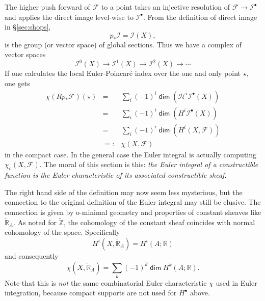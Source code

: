 \documentclass{psapm-l}
\theoremstyle{definition}
\theoremstyle{remark}
\numberwithin{equation}{section}
\begin{document}
The higher push forward of ${{\mathcal F}}$ to a point takes an injective resolution of ${{\mathcal F}}\to\mathcal{I}^{\bullet}$ and applies the direct image level-wise to $\mathcal{I}^{\bullet}$. From the definition of direct image in \S\ref{sec:shops},
\[
	p_*\mathcal{I}=\mathcal{I}(X) ,
\]
is the group (or vector space) of global sections. Thus we have a complex of vector spaces
\[
	\mathcal{I}^0(X)
	\stackrel{}{\longrightarrow} \mathcal{I}^1(X)
	\stackrel{}{\longrightarrow} \mathcal{I}^2(X)
	\stackrel{}{\longrightarrow} \cdots
\]
If one calculates the local Euler-Poincar\'e index over the one and only point $\star$, one gets
\begin{eqnarray*}
	\chi(Rp_*{{\mathcal F}})(\star) &=& \sum_i (-1)^i{{{\operatorname{\mathsf{{dim}}}}}}(\mathcal{H}^i\mathcal{I}^{\bullet}(X)) \\
	&=& \sum_i (-1)^i{{{\operatorname{\mathsf{{dim}}}}}}(H^i\mathcal{I}^{\bullet}(X)) \\
	&=& \sum_i (-1)^i{{{\operatorname{\mathsf{{dim}}}}}}(H^i(X,{{\mathcal F}})) \\
	&=:&\chi(X,{{\mathcal F}})
\end{eqnarray*}
in the compact case. In the general case the Euler integral is actually computing $\chi_c(X,{{\mathcal F}})$. The moral of this section is this:
{\em the Euler integral of a constructible function is the Euler characteristic of its associated constructible sheaf}.
	
The right hand side of the definition may now seem less mysterious, but the connection to the original definition of the Euler integral may still be elusive. The connection is given by o-minimal geometry and properties of constant sheaves like $\widetilde{{\mathbb R}}_A$. As noted for $\widetilde{{\mathbb Z}}$, the cohomology of the constant sheaf coincides with normal cohomology of the space. Specifically
\[
	H^i(X,\widetilde{{\mathbb R}}_A)=H^i(A;{{\mathbb R}})
\]
and consequently
\[
	\chi(X,\widetilde{{\mathbb R}}_A)
    = \sum_k(-1)^k{{{\operatorname{\mathsf{{dim}}}}}} H^k(A;{{\mathbb R}}) .
\]
Note that this is {\it not} the same combinatorial Euler characteristic $\chi$ used in Euler integration, because compact supports are not used for $H^{\bullet}$ above.
\end{document}
